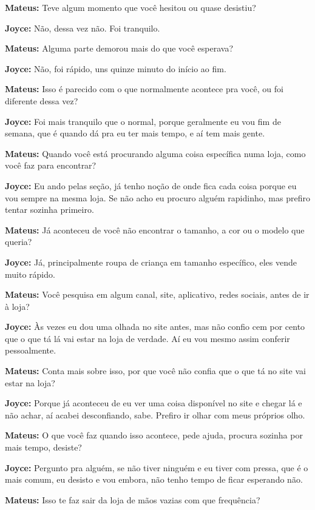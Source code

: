 \textbf{Mateus:} Teve algum momento que você hesitou ou quase desistiu?

\textbf{Joyce:} Não, dessa vez não. Foi tranquilo.

\textbf{Mateus:} Alguma parte demorou mais do que você esperava?

\textbf{Joyce:} Não, foi rápido, uns quinze minuto do início ao fim.

\textbf{Mateus:} Isso é parecido com o que normalmente acontece pra você, ou foi diferente dessa vez?

\textbf{Joyce:} Foi mais tranquilo que o normal, porque geralmente eu vou fim de semana, que é quando dá pra eu ter mais tempo, e aí tem mais gente.

\textbf{Mateus:} Quando você está procurando alguma coisa específica numa loja, como você faz para encontrar?

\textbf{Joyce:} Eu ando pelas seção, já tenho noção de onde fica cada coisa porque eu vou sempre na mesma loja. Se não acho eu procuro alguém rapidinho, mas prefiro tentar sozinha primeiro.

\textbf{Mateus:} Já aconteceu de você não encontrar o tamanho, a cor ou o modelo que queria?

\textbf{Joyce:} Já, principalmente roupa de criança em tamanho específico, eles vende muito rápido.

\textbf{Mateus:} Você pesquisa em algum canal, site, aplicativo, redes sociais, antes de ir à loja?

\textbf{Joyce:} Às vezes eu dou uma olhada no site antes, mas não confio cem por cento que o que tá lá vai estar na loja de verdade. Aí eu vou mesmo assim conferir pessoalmente.

\textbf{Mateus:} Conta mais sobre isso, por que você não confia que o que tá no site vai estar na loja?

\textbf{Joyce:} Porque já aconteceu de eu ver uma coisa disponível no site e chegar lá e não achar, aí acabei desconfiando, sabe. Prefiro ir olhar com meus próprios olho.

\textbf{Mateus:} O que você faz quando isso acontece, pede ajuda, procura sozinha por mais tempo, desiste?

\textbf{Joyce:} Pergunto pra alguém, se não tiver ninguém e eu tiver com pressa, que é o mais comum, eu desisto e vou embora, não tenho tempo de ficar esperando não.

\textbf{Mateus:} Isso te faz sair da loja de mãos vazias com que frequência?

